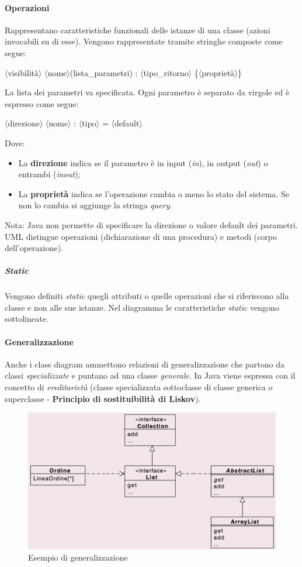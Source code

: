 \newpage
\paragraph{Operazioni} Rappresentano caratteristiche funzionali delle istanze di una classe (azioni invocabili su di esse). Vengono rappresentate tramite stringhe composte come segue:
\begin{center}
        $\langle$visibilità$\rangle$ $\langle$nome$\rangle$(lista\_parametri) : $\langle$tipo\_ritorno$\rangle$ \{$\langle$proprietà$\rangle$\}
\end{center}
La lista dei parametri va specificata. Ogni parametro è separato da virgole ed è espresso come segue:
\begin{center}
        $\langle$direzione$\rangle$ $\langle$nome$\rangle$ : $\langle$tipo$\rangle$ = $\langle$default$\rangle$
\end{center}
Dove:
\begin{itemize}
    \item La \textbf{direzione} indica se il parametro è in input (\textit{in}), in output (\textit{out}) o entrambi (\textit{inout});
    \item La \textbf{proprietà} indica se l'operazione cambia o meno lo stato del sistema. Se non lo cambia si aggiunge la stringa \textit{query}.
\end{itemize}
Nota: Java non permette di specificare la direzione o valore default dei parametri.
UML distingue operazioni (dichiarazione di una procedura) e metodi (corpo dell'operazione).

\subparagraph{Static} Vengono definiti \textit{static} quegli attributi o quelle operazioni che si riferiscono alla classe e non alle sue istanze. Nel diagramma le caratteristiche \textit{static} vengono sottolineate.

\paragraph{Generalizzazione} Anche i class diagram ammettono relazioni di generalizzazione che partono da classi \textit{specializzate} e puntano ad una classe \textit{generale}. In Java viene espressa con il concetto di \textit{ereditarietà} (classe specializzata sottoclasse di classe generica o superclasse - \textbf{Principio di sostituibilità di Liskov}).

\begin{figure}[H]
    \centering
    \includegraphics[width=0.75\linewidth]{assets/UML/class/class-8.png}
    \caption{Esempio di generalizzazione}
\end{figure}

